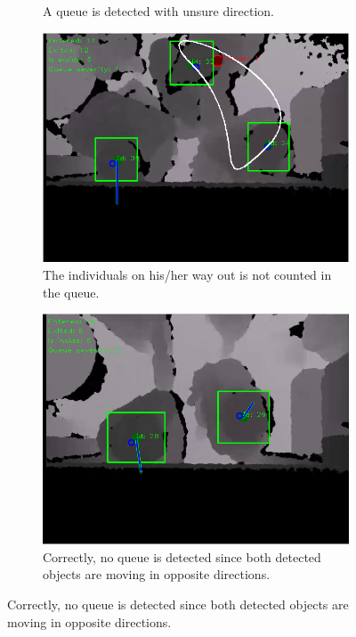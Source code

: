 \begin{figure}[H]
\begin{subfigure}{.4\textwidth}
  \caption{A queue is detected with unsure direction.}
  \label{fig:sub2}
\end{subfigure} 
\begin{subfigure}{.4\textwidth}
  \centering
  \includegraphics[width=1.0\linewidth]{images/queueDetected2.png}
  \caption{The individuals on his/her way out is not counted in the queue.}
  \label{fig:sub3}
\end{subfigure}
\begin{subfigure}{.4\textwidth}
  \centering
  \includegraphics[width=1.0\linewidth]{images/noQueue1.png}
  \caption{Correctly, no queue is detected since both detected objects are moving in opposite directions.}
  \label{fig:sub4}
\end{subfigure}

\end{figure}
